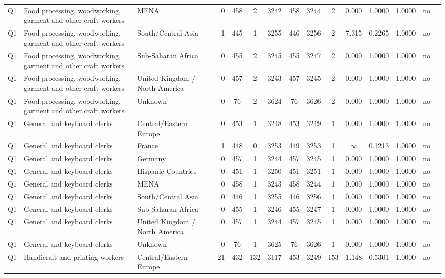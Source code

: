 \begin{longtable}{lllrcccccccccll}
Q1 & Food processing, woodworking, garment and other craft workers & MENA & 0 & 458 & 2 & 3242 & 458 & 3244 & 2 & 0.000 & 1.0000 & 1.0000 & no \\
Q1 & Food processing, woodworking, garment and other craft workers & South/Central Asia & 1 & 445 & 1 & 3255 & 446 & 3256 & 2 & 7.315 & 0.2265 & 1.0000 & no \\
Q1 & Food processing, woodworking, garment and other craft workers & Sub-Saharan Africa & 0 & 455 & 2 & 3245 & 455 & 3247 & 2 & 0.000 & 1.0000 & 1.0000 & no \\
Q1 & Food processing, woodworking, garment and other craft workers & United Kingdom / North America & 0 & 457 & 2 & 3243 & 457 & 3245 & 2 & 0.000 & 1.0000 & 1.0000 & no \\
Q1 & Food processing, woodworking, garment and other craft workers & Unknown & 0 & 76 & 2 & 3624 & 76 & 3626 & 2 & 0.000 & 1.0000 & 1.0000 & no \\
Q1 & General and keyboard clerks & Central/Eastern Europe & 0 & 453 & 1 & 3248 & 453 & 3249 & 1 & 0.000 & 1.0000 & 1.0000 & no \\
Q1 & General and keyboard clerks & France & 1 & 448 & 0 & 3253 & 449 & 3253 & 1 & $\infty$ & 0.1213 & 1.0000 & no \\
Q1 & General and keyboard clerks & Germany & 0 & 457 & 1 & 3244 & 457 & 3245 & 1 & 0.000 & 1.0000 & 1.0000 & no \\
Q1 & General and keyboard clerks & Hispanic Countries & 0 & 451 & 1 & 3250 & 451 & 3251 & 1 & 0.000 & 1.0000 & 1.0000 & no \\
Q1 & General and keyboard clerks & MENA & 0 & 458 & 1 & 3243 & 458 & 3244 & 1 & 0.000 & 1.0000 & 1.0000 & no \\
Q1 & General and keyboard clerks & South/Central Asia & 0 & 446 & 1 & 3255 & 446 & 3256 & 1 & 0.000 & 1.0000 & 1.0000 & no \\
Q1 & General and keyboard clerks & Sub-Saharan Africa & 0 & 455 & 1 & 3246 & 455 & 3247 & 1 & 0.000 & 1.0000 & 1.0000 & no \\
Q1 & General and keyboard clerks & United Kingdom / North America & 0 & 457 & 1 & 3244 & 457 & 3245 & 1 & 0.000 & 1.0000 & 1.0000 & no \\
Q1 & General and keyboard clerks & Unknown & 0 & 76 & 1 & 3625 & 76 & 3626 & 1 & 0.000 & 1.0000 & 1.0000 & no \\
Q1 & Handicraft and printing workers & Central/Eastern Europe & 21 & 432 & 132 & 3117 & 453 & 3249 & 153 & 1.148 & 0.5301 & 1.0000 & no \\

\end{longtable}
